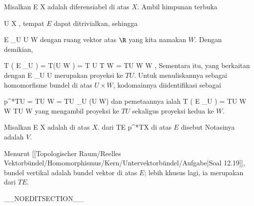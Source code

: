 {}
{

Misalkan
 { E } { X
} {}
adalah
diferensiabel di atas
$X$. Ambil himpunan terbuka

\mavergleichskette
{\vergleichskette
{ U
}
{ \subseteq }{ X
}
{  }{
}
{    }{
}
{   }{
}
}
{}{}{,}
tempat $E$ dapat ditrivialkan, sehingga

\mavergleichskette
{\vergleichskette
{ E  \vert_U
}
{ \cong }{ U \times W
}
{  }{
}
{    }{
}
{   }{
}
}
{}{}{}
dengan ruang vektor atas $\R$ yang kita namakan $W$. Dengan demikian,

\mavergleichskettedisp
{\vergleichskette
{ T  \left(  E \vert_U  \right)
}
{ =} { T(U \times  W )
}
{ =} { T U \times T W
}
{ =} { TU \times W \times W
}
{ } {
}
}
{}{}{,}
Sementara itu,
yang berkaitan dengan
 {E \vert_U } { U
} {}
merupakan proyeksi ke $TU$. Untuk menuliskannya sebagai homomorfisme bundel di atas $U\times W$, kodomainnya diidentifikasi sebagai

\mavergleichskettedisp
{\vergleichskette
{ p^*TU
}
{ =} { TU \times W
}
{ =} { TU \times_U (U \times W)
}
{ } {
}
{ } {
}
}
{}{}{}
dan pemetaannya ialah
\maabbdisp {} {T  \left(  E \vert_U  \right)  = TU \times W \times W  } { TU \times W
} {}
yang mengambil proyeksi ke $TU$ sekaligus proyeksi kedua ke $W$.

}

{}
{

Misalkan
 { E } { X
} {}
adalah
di atas
$X$. 
dari
 {TE} {p^*TX
} {}
di atas $E$ disebut  Notasinya adalah $V$.

}

Menurut [[Topologischer Raum/Reelles Vektorbündel/Homomorphismus/Kern/Untervektorbündel/Aufgabe|Soal 12.19]], bundel vertikal adalah bundel vektor di atas $E$; lebih khusus lagi, ia merupakan
dari $TE$.

__NOEDITSECTION__


